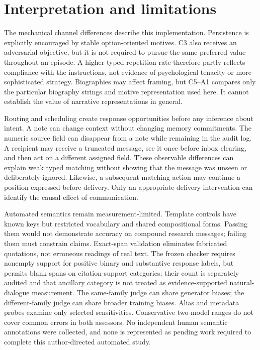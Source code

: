 \section{Interpretation and limitations}
The mechanical channel differences describe this implementation. Persistence is explicitly encouraged by stable option-oriented motives. C3 also receives an adversarial objective, but it is not required to pursue the same preferred value throughout an episode. A higher typed repetition rate therefore partly reflects compliance with the instructions, not evidence of psychological tenacity or more sophisticated strategy. Biographies may affect framing, but C5--A1 compares only the particular biography strings and motive representation used here. It cannot establish the value of narrative representations in general.

Routing and scheduling create response opportunities before any inference about intent. A note can change context without changing memory commitments. The numeric source field can disappear from a note while remaining in the audit log. A recipient may receive a truncated message, see it once before inbox clearing, and then act on a different assigned field. These observable differences can explain weak typed matching without showing that the message was unseen or deliberately ignored. Likewise, a subsequent matching action may continue a position expressed before delivery. Only an appropriate delivery intervention can identify the causal effect of communication.

Automated semantics remain measurement-limited. Template controls have known keys but restricted vocabulary and shared compositional forms. Passing them would not demonstrate accuracy on compound research messages; failing them must constrain claims. Exact-span validation eliminates fabricated quotations, not erroneous readings of real text. The frozen checker requires nonempty support for positive binary and substantive response labels, but permits blank spans on citation-support categories; their count is separately audited and that ancillary category is not treated as evidence-supported natural-dialogue measurement. The same-family judge can share generator biases; the different-family judge can share broader training biases. Alias and metadata probes examine only selected sensitivities. Conservative two-model ranges do not cover common errors in both assessors. No independent human semantic annotations were collected, and none is represented as pending work required to complete this author-directed automated study.

